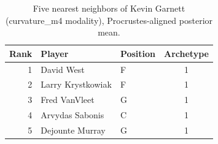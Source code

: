 \begin{table}[htbp]
  \centering\small
  \begin{tabular}{rllc}
    \toprule
    Rank & Player & Position & Archetype \\
    \midrule
    1 & David West & F & 1 \\
    2 & Larry Krystkowiak & F & 1 \\
    3 & Fred VanVleet & G & 1 \\
    4 & Arvydas Sabonis & C & 1 \\
    5 & Dejounte Murray & G & 1 \\
    \bottomrule
  \end{tabular}
  \caption{Five nearest neighbors of Kevin Garnett (curvature_m4 modality), Procrustes-aligned posterior mean.}
  \label{tab:Kevin_Garnett_neighbors_curvature_m4}
\end{table}

